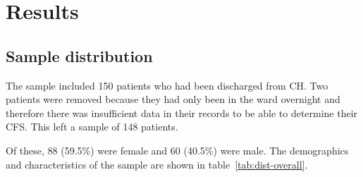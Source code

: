 \documentclass
[
	12pt,
	a4paper,
	oneside,
]{report}
\begin{document}
%
%

%
%

% 
%


\chapter{Results}

\section{Sample distribution}

The sample included 150 patients who had been discharged from CH. Two patients
were removed because they had only been in the ward overnight and therefore
there was insufficient data in their records to be able to determine their
CFS. This left a sample of 148 patients. 

Of these, 88 (59.5\%) were female and 60 (40.5\%) were male. The demographics 
and characteristics of the sample are shown in table~\ref{tab:dist-overall}.
\end{document}

